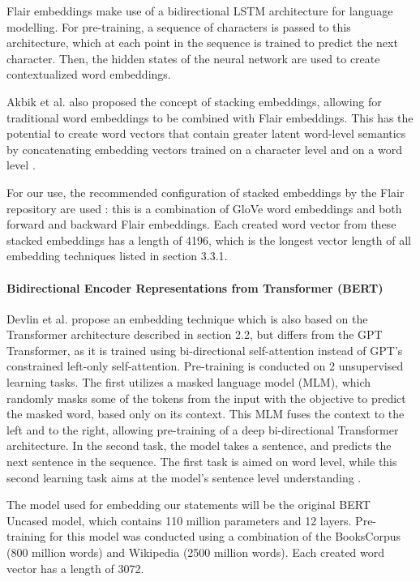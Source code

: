 Flair embeddings make use of a bidirectional LSTM architecture for language modelling. 
For pre-training, a sequence of characters is passed to this architecture, which at each point in the sequence is trained to predict the next character.
Then, the hidden states of the neural network are used to create contextualized word embeddings.

Akbik et al. also proposed the concept of stacking embeddings, allowing for traditional word embeddings to be combined with Flair embeddings.
This has the potential to create word vectors that contain greater latent word-level semantics by concatenating embedding vectors trained on a character level and on a word level \cite{akbik2018}.

For our use, the recommended configuration of stacked embeddings by the Flair repository are used \cite{flairembedding}: this is a combination of GloVe word embeddings \cite{pennington2014} and both forward and backward Flair embeddings.
Each created word vector from these stacked embeddings has a length of 4196, which is the longest vector length of all embedding techniques listed in section 3.3.1. 

\paragraph{Bidirectional Encoder Representations from Transformer (BERT)}
Devlin et al. propose an embedding technique which is also based on the Transformer architecture described in section 2.2, but differs from the GPT Transformer, as it is trained using bi-directional self-attention instead of GPT's constrained left-only self-attention.
Pre-training is conducted on 2 unsupervised learning tasks. 
The first utilizes a masked language model (MLM), which randomly masks some of the tokens from the input with the objective to predict the masked word, based only on its context.
This MLM fuses the context to the left and to the right, allowing pre-training of a deep bi-directional Transformer architecture.
In the second task, the model takes a sentence, and predicts the next sentence in the sequence. 
The first task is aimed on word level, while this second learning task aims at the model's sentence level understanding \cite{devlin2018}. 

The model used for embedding our statements will be the original BERT Uncased model, which contains 110 million parameters and 12 layers. 
Pre-training for this model was conducted using a combination of the BooksCorpus (800 million words) and Wikipedia (2500 million words).
Each created word vector has a length of 3072. 

